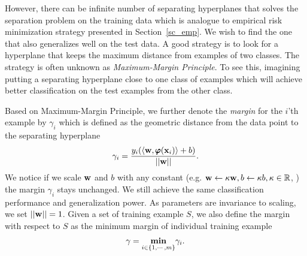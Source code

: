 {However, there can be infinite number of separating hyperplanes that solves the separation problem on the training data which is analogue to empirical risk minimization strategy presented in Section~\ref{sc_emp}. 
We wish to find the one that also generalizes well on the test data.
A good strategy is to look for a hyperplane that keeps the maximum distance from examples of two classes.
The strategy is often unknown as \textit{Maximum-Margin Principle}.
To see this, imagining putting a separating hyperplane close to one class of examples which will achieve better classification on the test examples from the other class.

Based on Maximum-Margin Principle, we further denote the \textit{margin} for the $i$'th example by $\gamma_i$ which is defined as the geometric distance from the data point to the separating hyperplane
\begin{align*}
	\gamma_i = \frac{y_i(\langle \mathbf {w}, \pmb \varphi(\mathbf {x}_i) \rangle+b)}{\left|\left| \mathbf {w} \right|\right|}.
\end{align*}
We notice if we scale $\mathbf {w}$ and $b$ with any constant (e.g. $\mathbf {w}\leftarrow\kappa\mathbf {w}, b\leftarrow\kappa b, \kappa\in\mathbb{R}$, ) the margin $\gamma_i$ stays unchanged. 
We still achieve the same classification performance and generalization power.
As parameters are invariance to scaling, we set $\left|\left| \mathbf {w} \right|\right|=1$.
Given a set of training example $S$, we also define the margin with respect to $S$ as the minimum margin of individual training example
\begin{align*}
	\gamma = \underset{i\in\{1,\cdots,m\}}{\textbf{min}}\gamma_i.
\end{align*}

}
